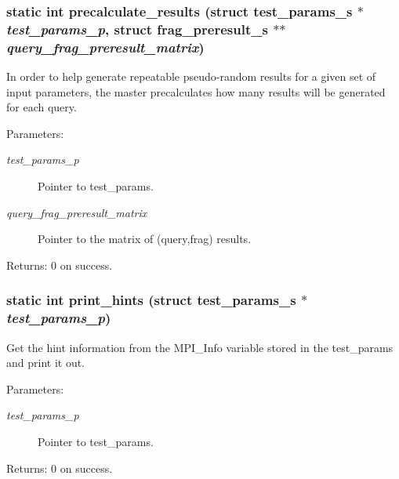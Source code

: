 \subsubsection{\setlength{\rightskip}{0pt plus 5cm}static int precalculate\_\-results (struct \bf{test\_\-params\_\-s} $\ast$ {\em test\_\-params\_\-p}, struct \bf{frag\_\-preresult\_\-s} $\ast$$\ast$ {\em query\_\-frag\_\-preresult\_\-matrix})\hspace{0.3cm}{\tt  [static]}}\label{s3asim_8c_c8907070a409c8c1569af91abd3e13c7}


In order to help generate repeatable pseudo-random results for a given set of input parameters, the master precalculates how many results will be generated for each query.

\begin{Desc}
\item[Parameters:]
\begin{description}
\item[{\em test\_\-params\_\-p}]Pointer to test\_\-params. \item[{\em query\_\-frag\_\-preresult\_\-matrix}]Pointer to the matrix of (query,frag) results. \end{description}
\end{Desc}
\begin{Desc}
\item[Returns:]0 on success. \end{Desc}
\subsubsection{\setlength{\rightskip}{0pt plus 5cm}static int print\_\-hints (struct \bf{test\_\-params\_\-s} $\ast$ {\em test\_\-params\_\-p})\hspace{0.3cm}{\tt  [static]}}\label{s3asim_8c_9be48a3efd8ac563f1b113126c03a388}


Get the hint information from the MPI\_\-Info variable stored in the test\_\-params and print it out.

\begin{Desc}
\item[Parameters:]
\begin{description}
\item[{\em test\_\-params\_\-p}]Pointer to test\_\-params. \end{description}
\end{Desc}
\begin{Desc}
\item[Returns:]0 on success. \end{Desc}
